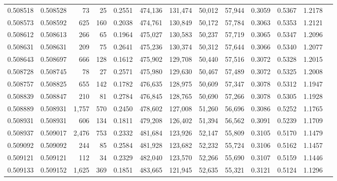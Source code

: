 \begin{tabular}{rrrrrrrrrrrrr}
0.508518 & 0.508528 &    73 &    25 &                                     0.2551 & 474,136 & 131,474 &  50,012 &  57,944 & 0.3059 & 0.5367 & 1.2178 \\
0.508573 & 0.508592 &   625 &   160 &                                     0.2038 & 474,761 & 130,849 &  50,172 &  57,784 & 0.3063 & 0.5353 & 1.2121 \\
0.508612 & 0.508613 &   266 &    65 &                                     0.1964 & 475,027 & 130,583 &  50,237 &  57,719 & 0.3065 & 0.5347 & 1.2096 \\
0.508631 & 0.508631 &   209 &    75 &                                     0.2641 & 475,236 & 130,374 &  50,312 &  57,644 & 0.3066 & 0.5340 & 1.2077 \\
0.508643 & 0.508697 &   666 &   128 &                                     0.1612 & 475,902 & 129,708 &  50,440 &  57,516 & 0.3072 & 0.5328 & 1.2015 \\
0.508728 & 0.508745 &    78 &    27 &                                     0.2571 & 475,980 & 129,630 &  50,467 &  57,489 & 0.3072 & 0.5325 & 1.2008 \\
0.508757 & 0.508825 &   655 &   142 &                                     0.1782 & 476,635 & 128,975 &  50,609 &  57,347 & 0.3078 & 0.5312 & 1.1947 \\
0.508839 & 0.508847 &   210 &    81 &                                     0.2784 & 476,845 & 128,765 &  50,690 &  57,266 & 0.3078 & 0.5305 & 1.1928 \\
0.508889 & 0.508931 & 1,757 &   570 &                                     0.2450 & 478,602 & 127,008 &  51,260 &  56,696 & 0.3086 & 0.5252 & 1.1765 \\
0.508931 & 0.508931 &   606 &   134 &                                     0.1811 & 479,208 & 126,402 &  51,394 &  56,562 & 0.3091 & 0.5239 & 1.1709 \\
0.508937 & 0.509017 & 2,476 &   753 &                                     0.2332 & 481,684 & 123,926 &  52,147 &  55,809 & 0.3105 & 0.5170 & 1.1479 \\
0.509092 & 0.509092 &   244 &    85 &                                     0.2584 & 481,928 & 123,682 &  52,232 &  55,724 & 0.3106 & 0.5162 & 1.1457 \\
0.509121 & 0.509121 &   112 &    34 &                                     0.2329 & 482,040 & 123,570 &  52,266 &  55,690 & 0.3107 & 0.5159 & 1.1446 \\
0.509133 & 0.509152 & 1,625 &   369 &                                     0.1851 & 483,665 & 121,945 &  52,635 &  55,321 & 0.3121 & 0.5124 & 1.1296 \\

\end{tabular}

